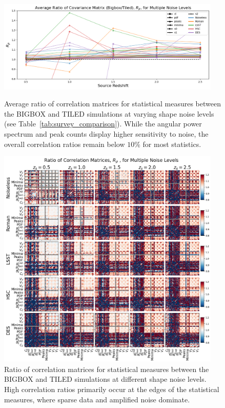 \begin{figure}[p]
    \centering
    \includegraphics[width=0.95\textwidth]{figures/results/avg_corr_ratio_noise.png}
    \caption[Average BIGBOX/TILED Ratio of Correlation for Multiple Noise Levels]
    {Average ratio of correlation matrices for statistical measures between the BIGBOX and TILED simulations at varying shape noise levels (see Table~\ref{tab:survey_comparison}). While the angular power spectrum and peak counts display higher sensitivity to noise, the overall correlation ratios remain below $10\%$ for most statistics.}
    \label{fig:avg_corr_noise}
    \includegraphics[width=0.95\textwidth]{figures/results/corr_noise.png}
    \caption[BIGBOX/TILED Ratio of Correlation for Multiple Noise Levels]
    {Ratio of correlation matrices for statistical measures between the BIGBOX and TILED simulations at different shape noise levels. High correlation ratios primarily occur at the edges of the statistical measures, where sparse data and amplified noise dominate. }
    \label{fig:corr_noise}
\end{figure}

